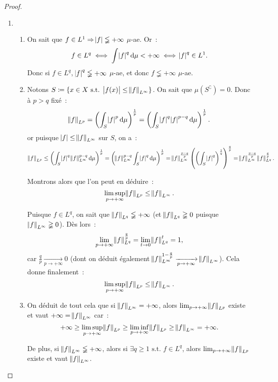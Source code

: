 \documentclass{article}
\theoremstyle{definition}
\newcommand{\pinfty}{{+\infty}}
\newcommand{\st}{\text{ s.t. }}
\newcommand{\C}{\complement}
\begin{document}
\begin{proof}
\begin{enumerate}
	{\small {}}

	\item~
	\begin{enumerate}
		\item On sait que $f \in L^1 \Rightarrow \abs f \lneqq \pinfty$ $\mu$-ae. Or~:
		\[f \in L^q \iff \int \abs f^q\dif\mu < \pinfty \iff \abs f^q \in L^1.\]
		Donc si $f \in L^q$, $\abs f^q \lneqq \pinfty$ $\mu$-ae, et donc $f \lneqq \pinfty$ $\mu$-ae.

		\item Notons $S \coloneqq \{x \in X \st \abs {f(x)} \leq \norm f_{L^\infty}\}$. On sait que $\mu(S^\C) = 0$. Donc à $p > q$ fixé~:
		\[\norm f_{L^p} = \left(\int_S \abs f^p\dif\mu\right)^{\frac 1p} = \left(\int_S \abs f^q\abs f^{p-q}\dif\mu\right)^{\frac 1p}.\]
		or puisque $\abs f \leq \norm f_{L^\infty}$ sur $S$, on a~:
		\[\norm f_{L^p} \leq \left(\int_S\abs f^q\norm f_{L^\infty}^{p-q}\dif\mu\right)^{\frac 1p} = \left(\norm f_{L^\infty}^{p-q}\int_S\abs f^q\dif\mu\right)^{\frac 1p}
		= \norm f_{L^\infty}^{\frac {p-q}p}\left(\left(\int_S \abs f^q\right)^{\frac 1q}\right)^{\frac qp} = \norm f_{L^\infty}^{\frac {p-q}p}\norm f_{L^q}^{\frac qp}.\]

		Montrons alors que l'on peut en déduire~:
		\[\limsup_{p \to \pinfty}\norm f_{L^p} \leq \norm f_{L^\infty}.\]

		Puisque $f \in L^q$, on sait que $\norm f_{L^q} \lneqq \pinfty$ (et $\norm f_{L^q} \gneqq 0$ puisque $\norm f_{L^\infty} \gneqq 0$). Dès lors~:
		\[\lim_{p \to \pinfty}\norm f_{L^q}^{\frac qp} = \lim_{t \to 0}\norm f_{L^q}^t = 1,\]
		car $\frac qp \xrightarrow[p \to \pinfty]{} 0$ (dont on déduit également $\norm f_{L^\infty}^{1-\frac qp} \xrightarrow[p \to \pinfty]{} \norm f_{L^\infty}$). Cela donne
		finalement~:
		\[\limsup_{p \to \pinfty}\norm f_{L^p} \leq \norm f_{L^\infty}.\]

		\item On déduit de tout cela que si $\norm f_{L^\infty} = \pinfty$, alors $\lim_{p \to \pinfty}\norm f_{L^p}$ existe et vaut $\pinfty = \norm f_{L^\infty}$ car~:
		\[\pinfty \geq \limsup_{p \to \pinfty}\norm f_{L^p} \geq \liminf_{p \to \pinfty}\norm f_{L^p} \geq \norm f_{L^\infty} = \pinfty.\]


		De plus, si $\norm f_{L^\infty} \lneqq \pinfty$, alors si $\exists q \geq 1 \st f \in L^q$, alors $\lim_{p \to \pinfty} \norm f_{L^p}$ existe et vaut $\norm f_{L^\infty}$.

		\end{enumerate}
\end{enumerate}
\end{proof}
\end{document}
